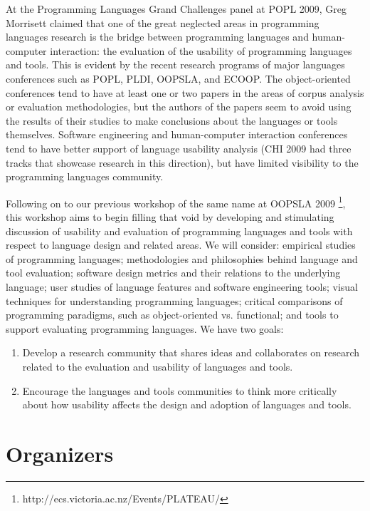 \documentclass{sigplanconf}
\begin{document}
At the Programming Languages Grand Challenges panel at POPL 2009, Greg
Morrisett claimed that one of the great neglected areas in programming
languages research is the bridge between programming languages and
human-computer interaction: the evaluation of the usability of
programming languages and tools. This is evident by the recent
research programs of major languages conferences such as POPL, PLDI,
OOPSLA, and ECOOP. The object-oriented conferences tend to have at
least one or two papers in the areas of corpus analysis or evaluation
methodologies, but the authors of the papers seem to avoid using the
results of their studies to make conclusions about the languages or
tools themselves. Software engineering and human-computer interaction
conferences tend to have better support of language usability analysis
(CHI 2009 had three tracks that showcase research in this direction),
but have limited visibility to the programming languages community.

Following on to our previous workshop of the same name at OOPSLA 2009
\footnote{http://ecs.victoria.ac.nz/Events/PLATEAU/},
this workshop aims to begin filling that void by
developing and stimulating discussion of usability and evaluation of
programming languages and tools with respect to language design and
related areas. We will consider: empirical studies of programming
languages; methodologies and philosophies behind language and tool
evaluation; software design metrics and their relations to the
underlying language; user studies of language features and software
engineering tools; visual techniques for understanding programming
languages; critical comparisons of programming paradigms, such as
object-oriented vs. functional; and tools to support evaluating
programming languages. We have two goals:

\begin{enumerate}
  \item 
Develop a research community that shares ideas and collaborates on 
research related to the evaluation and usability of languages and tools.
\item
Encourage the languages and tools communities to think more critically
about how usability affects the  design and
adoption of languages and tools.
\end{enumerate}


\section{Organizers}
\end{document}
